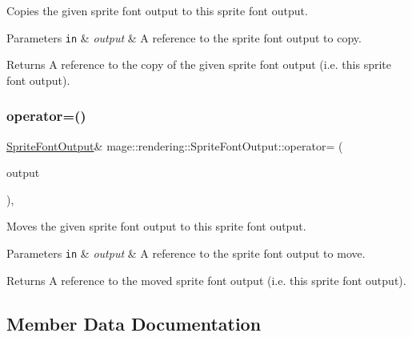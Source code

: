 Copies the given sprite font output to this sprite font output.


\begin{DoxyParams}[1]{Parameters}
\mbox{\tt in}  & {\em output} & A reference to the sprite font output to copy. \\
\hline
\end{DoxyParams}
\begin{DoxyReturn}{Returns}
A reference to the copy of the given sprite font output (i.\+e. this sprite font output). 
\end{DoxyReturn}
\mbox{\label{structmage_1_1rendering_1_1_sprite_font_output_aff107541c1b9a0fb3052a6ed0dbae7dd}} 
\subsubsection{\texorpdfstring{operator=()}{operator=()}\hspace{0.1cm}{\footnotesize\ttfamily [2/2]}}
{\footnotesize\ttfamily \mbox{\hyperlink{structmage_1_1rendering_1_1_sprite_font_output}{Sprite\+Font\+Output}}\& mage\+::rendering\+::\+Sprite\+Font\+Output\+::operator= (\begin{DoxyParamCaption}\item[{\mbox{\hyperlink{structmage_1_1rendering_1_1_sprite_font_output}{Sprite\+Font\+Output}} \&\&}]{output }\end{DoxyParamCaption})\hspace{0.3cm}{\ttfamily [default]}, {\ttfamily [noexcept]}}

Moves the given sprite font output to this sprite font output.


\begin{DoxyParams}[1]{Parameters}
\mbox{\tt in}  & {\em output} & A reference to the sprite font output to move. \\
\hline
\end{DoxyParams}
\begin{DoxyReturn}{Returns}
A reference to the moved sprite font output (i.\+e. this sprite font output). 
\end{DoxyReturn}


\subsection{Member Data Documentation}
\mbox{\label{structmage_1_1rendering_1_1_sprite_font_output_af35542b71c315b2ed6059ab53413d34c}} 
